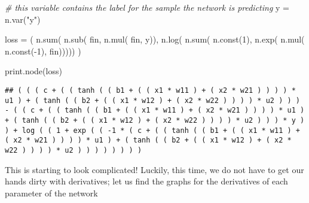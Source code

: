 \documentclass[
  a4paper,
]{article}
\newenvironment{Shaded}{\begin{snugshade}}{\end{snugshade}}
\newcommand{\CommentTok}[1]{\textcolor[rgb]{0.56,0.35,0.01}{\textit{#1}}}
\newcommand{\ControlFlowTok}[1]{\textcolor[rgb]{0.13,0.29,0.53}{\textbf{#1}}}
\newcommand{\DecValTok}[1]{\textcolor[rgb]{0.00,0.00,0.81}{#1}}
\newcommand{\FunctionTok}[1]{\textcolor[rgb]{0.00,0.00,0.00}{#1}}
\newcommand{\NormalTok}[1]{#1}
\newcommand{\OtherTok}[1]{\textcolor[rgb]{0.56,0.35,0.01}{#1}}
\newcommand{\SpecialCharTok}[1]{\textcolor[rgb]{0.00,0.00,0.00}{#1}}
\newcommand{\StringTok}[1]{\textcolor[rgb]{0.31,0.60,0.02}{#1}}
\begin{document}
\begin{Shaded}
\begin{Highlighting}[]
\CommentTok{\# this variable contains the label for the sample the network is predicting}
\NormalTok{y }\OtherTok{=} \FunctionTok{n.var}\NormalTok{(}\StringTok{"y"}\NormalTok{)}

\NormalTok{loss }\OtherTok{=}\NormalTok{ (}
  \FunctionTok{n.sum}\NormalTok{(}
     \FunctionTok{n.sub}\NormalTok{(}
\NormalTok{        fin,}
        \FunctionTok{n.mul}\NormalTok{(}
\NormalTok{           fin,}
\NormalTok{           y)),}
     \FunctionTok{n.log}\NormalTok{(}
        \FunctionTok{n.sum}\NormalTok{(}
           \FunctionTok{n.const}\NormalTok{(}\DecValTok{1}\NormalTok{),}
           \FunctionTok{n.exp}\NormalTok{(}
              \FunctionTok{n.mul}\NormalTok{(}
                 \FunctionTok{n.const}\NormalTok{(}\SpecialCharTok{{-}}\DecValTok{1}\NormalTok{),}
\NormalTok{                 fin)))))}
\NormalTok{)}

\FunctionTok{print.node}\NormalTok{(loss)}
\end{Highlighting}
\end{Shaded}

\begin{verbatim}
## ( ( ( c + ( ( tanh ( ( b1 + ( ( x1 * w11 ) + ( x2 * w21 ) ) ) ) * u1 ) + ( tanh ( ( b2 + ( ( x1 * w12 ) + ( x2 * w22 ) ) ) ) * u2 ) ) ) - ( ( c + ( ( tanh ( ( b1 + ( ( x1 * w11 ) + ( x2 * w21 ) ) ) ) * u1 ) + ( tanh ( ( b2 + ( ( x1 * w12 ) + ( x2 * w22 ) ) ) ) * u2 ) ) ) * y ) ) + log ( ( 1 + exp ( ( -1 * ( c + ( ( tanh ( ( b1 + ( ( x1 * w11 ) + ( x2 * w21 ) ) ) ) * u1 ) + ( tanh ( ( b2 + ( ( x1 * w12 ) + ( x2 * w22 ) ) ) ) * u2 ) ) ) ) ) ) ) )
\end{verbatim}

This is starting to look complicated! Luckily, this time, we do not have
to get our hands dirty with derivatives; let us find the graphs for the
derivatives of each parameter of the network

\begin{Shaded}
\end{Shaded}
\end{document}
